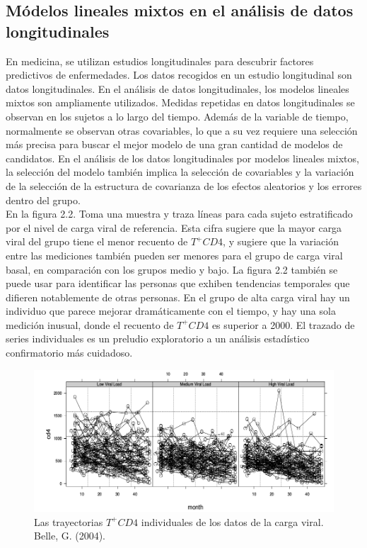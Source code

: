 \subsection{M\'odelos lineales mixtos en el an\'alisis de datos longitudinales}

	En medicina, se utilizan estudios longitudinales para descubrir factores predictivos de enfermedades. Los datos recogidos en un estudio longitudinal son datos longitudinales. En el an\'alisis de datos longitudinales, los modelos lineales mixtos son ampliamente utilizados. Medidas repetidas en datos longitudinales se observan en los sujetos a lo largo del tiempo. Adem\'as de la variable de tiempo, normalmente se observan otras covariables, lo que a su vez requiere una selecci\'on m\'as precisa para buscar el mejor modelo de una gran cantidad de modelos de candidatos. En el an\'alisis de los datos longitudinales por modelos lineales mixtos, la selecci\'on del modelo tambi\'en implica la selecci\'on de covariables y la variaci\'on de la selecci\'on de la estructura de covarianza de los efectos aleatorios y los errores dentro del grupo.\\
	
	En la figura 2.2. Toma una muestra y traza l\'ineas para cada sujeto estratificado por el nivel de carga viral de referencia. Esta cifra sugiere que la mayor carga viral del grupo tiene el menor recuento de $T^{+}CD4$, y sugiere que la variaci\'on entre las mediciones tambi\'en pueden ser menores para el grupo de carga viral basal, en comparación con los grupos medio y bajo. La figura 2.2 tambi\'en se puede usar para identificar las personas que exhiben tendencias temporales que difieren notablemente de otras personas. En el grupo de alta carga viral hay un individuo que parece mejorar dram\'aticamente con el tiempo, y hay una sola medici\'on inusual, donde el recuento de $T^{+}CD4$ es superior a 2000. El trazado de series individuales es un preludio exploratorio a un an\'alisis estad\'istico confirmatorio m\'as cuidadoso.
	
	\begin{figure}[H]
	\centering
	\includegraphics[scale=0.4]{mixed.png}
	\caption{Las trayectorias $T^{+}CD4$ individuales de los datos de la carga viral. Belle, G. (2004).}
	\end{figure}
	
